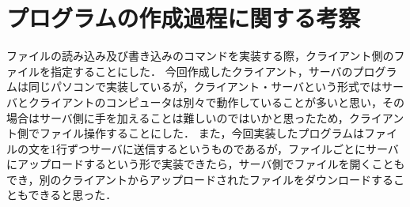 \documentclass{jarticle}[11pt]
\begin{document}
    \section{プログラムの作成過程に関する考察}
    ファイルの読み込み及び書き込みのコマンドを実装する際，クライアント側のファイルを指定することにした．
今回作成したクライアント，サーバのプログラムは同じパソコンで実装しているが，クライアント・サーバという形式ではサーバとクライアントのコンピュータは別々で動作していることが多いと思い，その場合はサーバ側に手を加えることは難しいのではいかと思ったため，クライアント側でファイル操作することにした．
また，今回実装したプログラムはファイルの文を1行ずつサーバに送信するというものであるが，ファイルごとにサーバにアップロードするという形で実装できたら，サーバ側でファイルを開くこともでき，別のクライアントからアップロードされたファイルをダウンロードすることもできると思った． %

























\end{document}
